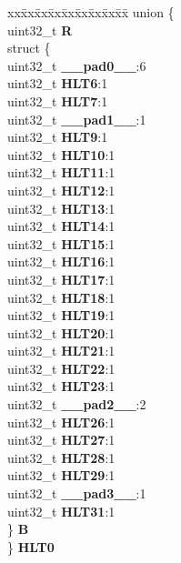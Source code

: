 \begin{DoxyCompactItemize}
\begin{tabbing}
\end{tabbing}\item 
\mbox{\label{structSIU__tag_afa76efbfc74d93094752d724ead67302}} 
\begin{tabbing}
xx\=xx\=xx\=xx\=xx\=xx\=xx\=xx\=xx\=\kill
union \{\\
\>uint32\_t {\bfseries R}\\
\>struct \{\\
\>\>uint32\_t {\bfseries \_\_pad0\_\_}:6\\
\>\>uint32\_t {\bfseries HLT6}:1\\
\>\>uint32\_t {\bfseries HLT7}:1\\
\>\>uint32\_t {\bfseries \_\_pad1\_\_}:1\\
\>\>uint32\_t {\bfseries HLT9}:1\\
\>\>uint32\_t {\bfseries HLT10}:1\\
\>\>uint32\_t {\bfseries HLT11}:1\\
\>\>uint32\_t {\bfseries HLT12}:1\\
\>\>uint32\_t {\bfseries HLT13}:1\\
\>\>uint32\_t {\bfseries HLT14}:1\\
\>\>uint32\_t {\bfseries HLT15}:1\\
\>\>uint32\_t {\bfseries HLT16}:1\\
\>\>uint32\_t {\bfseries HLT17}:1\\
\>\>uint32\_t {\bfseries HLT18}:1\\
\>\>uint32\_t {\bfseries HLT19}:1\\
\>\>uint32\_t {\bfseries HLT20}:1\\
\>\>uint32\_t {\bfseries HLT21}:1\\
\>\>uint32\_t {\bfseries HLT22}:1\\
\>\>uint32\_t {\bfseries HLT23}:1\\
\>\>uint32\_t {\bfseries \_\_pad2\_\_}:2\\
\>\>uint32\_t {\bfseries HLT26}:1\\
\>\>uint32\_t {\bfseries HLT27}:1\\
\>\>uint32\_t {\bfseries HLT28}:1\\
\>\>uint32\_t {\bfseries HLT29}:1\\
\>\>uint32\_t {\bfseries \_\_pad3\_\_}:1\\
\>\>uint32\_t {\bfseries HLT31}:1\\
\>\} {\bfseries B}\\
\} {\bfseries HLT0}\\


\end{tabbing}
\end{DoxyCompactItemize}
